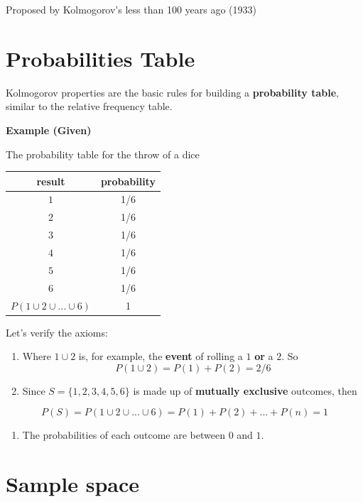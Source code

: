 \documentclass[
]{book}
\providecommand{\tightlist}{%
  \setlength{\itemsep}{0pt}\setlength{\parskip}{0pt}}
\begin{document}
Proposed by Kolmogorov's less than 100 years ago (1933)

\hypertarget{probabilities-table}{%
\section{Probabilities Table}\label{probabilities-table}}

Kolmogorov properties are the basic rules for building a \textbf{probability table}, similar to the relative frequency table.

\textbf{Example (Given)}

The probability table for the throw of a dice

\begin{longtable}[]{@{}cc@{}}
\toprule
result & probability \\
\midrule
\endhead
\(1\) & 1/6 \\
\(2\) & 1/6 \\
\(3\) & 1/6 \\
\(4\) & 1/6 \\
\(5\) & 1/6 \\
\(6\) & 1/6 \\
\(P( 1 \cup 2\cup ... \cup 6)\) & 1 \\
\bottomrule
\end{longtable}

Let's verify the axioms:

\begin{enumerate}
\def\labelenumi{\arabic{enumi})}
\item
  Where \(1 \cup 2\) is, for example, the \textbf{event} of rolling a \(1\) \textbf{or} a \(2\). So \[ P( 1 \cup 2)=P(1)+P(2)=2/6\]
\item
  Since \(S= \{ 1,2,3,4,5,6\}\) is made up of \textbf{mutually exclusive} outcomes, then
\end{enumerate}

\[P(S)=P(1\cup 2\cup ... \cup 6) = P(1)+P(2)+ ...+P(n)=1\]

\begin{enumerate}
\def\labelenumi{\arabic{enumi})}
\setcounter{enumi}{2}
\tightlist
\item
  The probabilities of each outcome are between \(0\) and \(1\).
\end{enumerate}

\hypertarget{sample-space}{%
\section{Sample space}\label{sample-space}}
\end{document}
